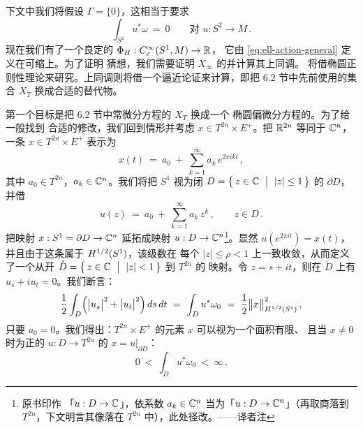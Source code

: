 下文中我们将假设 $\Gamma=\{0\}$，这相当于要求
\begin{equation}\label{eq:ell-period-zero}
\int_{S^{2}}u^{*}\omega\ =\ 0\qquad\text{对 }u:S^{2}\to M\,.
\end{equation}
现在我们有了一个良定的\trFunctional{} $\Phi_{H}:C^{\infty}_{c}(S^{1},M)\to\mathbb{R}$，%
它由 \eqref{eq:ell-action-general} 定义在可缩\trLoop{}上。为了证明%
\trArnold{}猜想，我们需要证明 $X_{\infty}$ 的\trCompactness{}并计算其上同调。%
\trCompactness{}将借椭圆正则性理论来研究。上同调则将借一个逼近论证来计算，即把%
6.2 节中先前使用的集合 $X_{T}$ 换成合适的替代物。

第一个目标是把 6.2 节中常微分方程的\trBoundaryValueProblem{} $X_{T}$ 换成一个%
椭圆偏微分方程的\trBoundaryValueProblem。为了给一般\trSymplecticManifold{}找到%
合适的修改，我们回到\trTorus{}情形并考虑 $x\in T^{2n}\times E^{+}$。把 $\mathbb{R}^{2n}$%
等同于 $\mathbb{C}^{n}$，一条\trLoop{} $x\in T^{2n}\times E^{+}$ 表示为
\begin{equation}\label{eq:ell-loop-fourier}
x(t)\ =\ a_{0}\ +\ \sum_{k=1}^{\infty}a_{k}\,e^{2\pi ikt}\,,
\end{equation}
其中 $a_{0}\in T^{2n}$，$a_{k}\in\mathbb{C}^{n}$。我们将把 $S^{1}$ 视为闭\trDisc{}%
$D=\bigl\{\,z\in\C\ \bigm|\ |z|\leq1\,\bigr\}$ 的\trBoundary{} $\partial D$，%
并借
\begin{equation}\label{eq:ell-disc-extension}
u(z)\ =\ a_{0}\ +\ \sum_{k=1}^{\infty}a_{k}\,z^{k}\,,\qquad z\in D\,.
\end{equation}
把映射 $x:S^{1}=\partial D\to\mathbb{C}^{n}$ 延拓成映射 $u:D\to\mathbb{C}^{n}$\footnote{原书印作%
「$u:D\to\mathbb{C}$」，依系数 $a_{k}\in\mathbb{C}^{n}$ 当为「$u:D\to\mathbb{C}^{n}$」（再取商落到%
$T^{2n}$，下文明言其像落在 $T^{2n}$ 中），此处径改。——译者注}。显然%
$u(e^{2\pi it})=x(t)$，并且由于这条\trLoop{}属于 $H^{1/2}(S^{1})$，该级数在%
每个\trDisc{} $|z|\leq\rho<1$ 上一致收敛，从而定义了一个从开\trDisc{}%
$\mathring{D}=\bigl\{\,z\in\C\ \bigm|\ |z|<1\,\bigr\}$ 到 $T^{2n}$ 的%
\trHolomorphic{}映射。令 $z=s+it$，则在 $\mathring{D}$ 上有%
$u_{s}+iu_{t}=0$。我们断言：
\begin{equation}\label{eq:ell-area-holodisc}
\frac{1}{2}\int_{D}\Bigl(\bigl|u_{s}\bigr|^{2}+\bigl|u_{t}\bigr|^{2}\Bigr)\,ds\,dt\ =\ \int_{D}u^{*}\omega_{0}\ =\ \frac{1}{2}\bigl\|x\bigr\|^{2}_{\Hh{1}{2}(S^{1})}\,,
\end{equation}
只要 $a_{0}=0$。我们得出：$T^{2n}\times E^{+}$ 的元素 $x$ 可以视为一个面积有限、%
且当 $x\neq0$ 时为正的\trHolomorphic\trDisc{} $u:D\to T^{2n}$ 的\trBoundary{}%
$x=u\big|_{\partial D}$：
\[
0\ <\ \int_{D}u^{*}\omega_{0}\ <\ \infty\,.
\]

